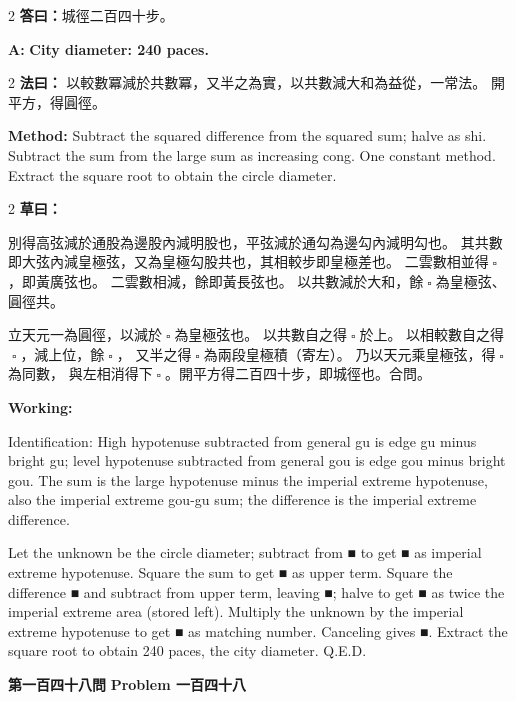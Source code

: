 \documentclass[11pt,a4paper]{article}
\let\origsquare\square
\renewcommand{\square}{\ensuremath{\origsquare}}%
\newcommand{\wen}[1]{%
  \par\vspace{0.5em}%
  \noindent\textcolor{problemcolor}{\textbf{第#1問}}%
  \hfill\textcolor{problemcolor}{\textbf{Problem #1}}\par\nopagebreak%
  \vspace{0.3em}%
}
\newcommand{\fayue}[1]{%
  \noindent\textcolor{methodcolor}{\textbf{法曰：}}{\tradfont #1}\par\nopagebreak%
}
\newcommand{\fayueeng}[1]{%
  \noindent\textcolor{engcolor}{\textbf{Method: }}{#1}\par\nopagebreak%
}
\newcommand{\tsaoyue}[1]{%
  \noindent\textcolor{workcolor}{\textbf{草曰：}}{\tradfont #1}\par%
}
\newcommand{\tsaoyueeng}[1]{%
  \noindent\textcolor{engcolor}{\textbf{Working: }}{\small #1}\par%
}
\newcommand{\dayue}[1]{%
  \noindent\textcolor{anscolor}{\textbf{答曰：}}{\tradfont #1}\par\nopagebreak%
}
\newcommand{\dayueeng}[1]{%
  \noindent\textcolor{engcolor}{\textbf{A: }}{\bfseries #1}\par\nopagebreak%
}
\begin{document}
\begin{paracol}{2}
\dayue{城徑二百四十步。}
\switchcolumn
\dayueeng{City diameter: 240 paces.}
\end{paracol}

\begin{paracol}{2}
\fayue{%
以較數冪減於共數冪，又半之為實，以共數減大和為益從，一常法。
開平方，得圓徑。}
\switchcolumn
\fayueeng{%
Subtract the squared difference from the squared sum; halve as shi. Subtract the sum from the large sum as increasing cong. One constant method. Extract the square root to obtain the circle diameter.}
\end{paracol}

\begin{paracol}{2}
\tsaoyue{%
別得高弦減於通股為邊股內減明股也，平弦減於通勾為邊勾內減明勾也。
其共數即大弦內減皇極弦，又為皇極勾股共也，其相較步即皇極差也。
二雲數相並得$ \; \square \; $，即黃廣弦也。
二雲數相減，餘即黃長弦也。
以共數減於大和，餘$ \; \square \; $為皇極弦、圓徑共。

立天元一為圓徑，以減於$ \; \square \; $為皇極弦也。
以共數自之得$ \; \square \; $於上。
以相較數自之得$ \; \square \; $，減上位，餘$ \; \square \; $，
又半之得$ \; \square \; $為兩段皇極積（寄左）。
乃以天元乘皇極弦，得$ \; \square \; $為同數，
與左相消得下$ \; \square \; $。開平方得二百四十步，即城徑也。合問。}
\switchcolumn
\tsaoyueeng{%
Identification: High hypotenuse subtracted from general gu is edge gu minus bright gu; level hypotenuse subtracted from general gou is edge gou minus bright gou. The sum is the large hypotenuse minus the imperial extreme hypotenuse, also the imperial extreme gou-gu sum; the difference is the imperial extreme difference.

Let the unknown be the circle diameter; subtract from ■ to get ■ as imperial extreme hypotenuse. Square the sum to get ■ as upper term. Square the difference ■ and subtract from upper term, leaving ■; halve to get ■ as twice the imperial extreme area (stored left). Multiply the unknown by the imperial extreme hypotenuse to get ■ as matching number. Canceling gives ■. Extract the square root to obtain 240 paces, the city diameter. Q.E.D.}
\end{paracol}

\vspace{0.5cm}

\wen{一百四十八}
\end{document}
